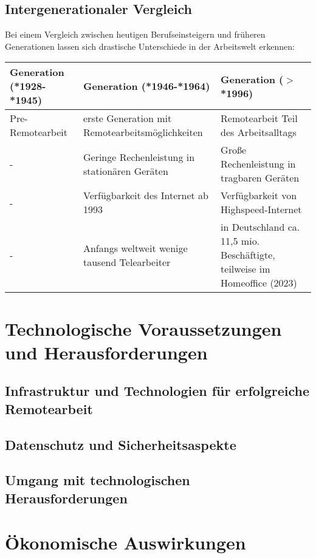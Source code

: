 \documentclass[runningheads]{llncs}
\begin{document}
\subsection{Intergenerationaler Vergleich}
Bei einem Vergleich zwischen heutigen Berufseinsteigern und früheren Generationen lassen sich drastische Unterschiede in der Arbeitswelt erkennen:
\vspace{-\baselineskip}
\begin{center}
\begin{tabular}{ | m{13em} | m{13em}| m{13em} | } 
\hline
Generation (*1928-*1945) & Generation (*1946-*1964) & Generation ($>$*1996) \\
\hline
Pre-Remotearbeit & erste Generation mit Remotearbeitsmöglichkeiten & Remotearbeit Teil des Arbeits\-alltags\\
\hline
- & Geringe Rechenleistung in stationären Geräten & Große Rechenleistung in tragbaren Geräten\\
\hline
- & Verfügbarkeit des Internet ab 1993\cite{CERN} & Verfügbarkeit von Highspeed-Internet\\
\hline
- & Anfangs weltweit wenige tausend Telearbeiter\cite{heilmann1983softwareentwicklung} & in Deutschland ca. 11,5 mio. Beschäftigte, teilweise im Homeoffice (2023)\cite{StatistischesBundesamt.03.01.2024, ifo23}\\
\hline
\end{tabular}
\end{center}

\section{Technologische Voraussetzungen und Herausforderungen}

\subsection{Infrastruktur und Technologien für erfolgreiche Remotearbeit}

\subsection{Datenschutz und Sicherheitsaspekte}

\subsection{Umgang mit technologischen Herausforderungen}


\section{Ökonomische Auswirkungen}
\end{document}
